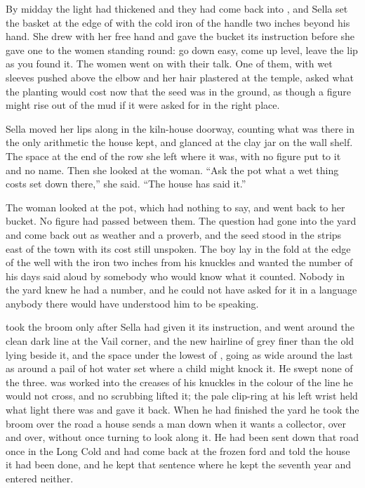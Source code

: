 \scenebreak

By midday the light had thickened and they had come back into , and Sella set the basket at the edge of  with the cold iron of the handle two inches beyond his hand. She drew with her free hand and gave the bucket its instruction before she gave one to the women standing round: go down easy, come up level, leave the lip as you found it. The women went on with their talk. One of them, with wet sleeves pushed above the elbow and her hair plastered at the temple, asked what the planting would cost now that the seed was in the ground, as though a figure might rise out of the mud if it were asked for in the right place.

Sella moved her lips along  in the kiln-house doorway, counting what was there in the only arithmetic the house kept, and glanced at the clay jar on the wall shelf. The space at the end of the row she left where it was, with no figure put to it and no name. Then she looked at the woman. “Ask the pot what a wet thing costs set down there,” she said. “The house has said it.”

The woman looked at the pot, which had nothing to say, and went back to her bucket. No figure had passed between them. The question had gone into the yard and come back out as weather and a proverb, and the seed stood in the strips east of the town with its cost still unspoken. The boy lay in the fold at the edge of the well with the iron two inches from his knuckles and wanted the number of his days said aloud by somebody who would know what it counted. Nobody in the yard knew he had a number, and he could not have asked for it in a language anybody there would have understood him to be speaking.

 took the broom only after Sella had given it its instruction, and went around the clean dark line at the Vail corner, and the new hairline of grey finer than the old lying beside it, and the space under the lowest of , going as wide around the last as around a pail of hot water set where a child might knock it. He swept none of the three.  was worked into the creases of his knuckles in the colour of the line he would not cross, and no scrubbing lifted it; the pale clip-ring at his left wrist held what light there was and gave it back. When he had finished the yard he took the broom over the road a house sends a man down when it wants a collector, over and over, without once turning to look along it. He had been sent down that road once in the Long Cold and had come back at the frozen ford and told the house it had been done, and he kept that sentence where he kept the seventh year and entered neither.

